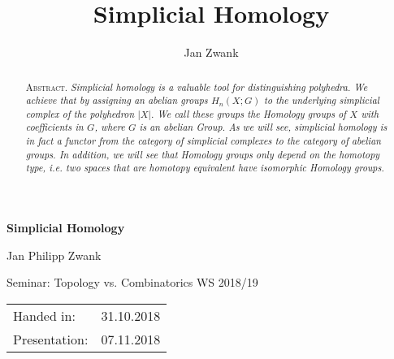 \documentclass[toc=bib, headinclude]{scrartcl}
\title{Simplicial Homology}
\author{Jan Zwank}
\theoremstyle{plain}
\theoremstyle{definition}
\theoremstyle{remark}
\begin{document}
\begin{titlepage}
	\thispagestyle{empty}
	\begin{center}
	\vspace{2cm}
	{\LARGE\bfseries\sffamily Simplicial Homology}
	
	\vspace{1cm}
	
	{\Large Jan Philipp Zwank}
	
	\vspace{0.5cm}
	{Seminar: Topology vs. Combinatorics WS 2018/19}
	
	\vspace{.25cm}
	\begin{tabular}{ll}
		Handed in:&31.10.2018\\
		Presentation:&07.11.2018
	\end{tabular}
\vspace{0.5cm}
	
	\begin{abstract}
		\textsc{Abstract.}\textit{
		Simplicial homology is a valuable tool for distinguishing polyhedra. We achieve that by assigning an abelian groups $H_n(X;G)$ to the underlying simplicial complex of the polyhedron $|X|$. We call these groups the Homology groups of $X$ with coefficients in $G$, where $G$ is an abelian Group. As we will see, simplicial homology is in fact a functor from the category of simplicial complexes to the category of abelian groups. In addition, we will see that Homology groups only depend on the homotopy type, i.e. two spaces that are homotopy equivalent have isomorphic Homology groups.
		}
	\end{abstract}

\clearpage
\end{center}\end{titlepage}
\tableofcontents

\clearpage
\end{document}
